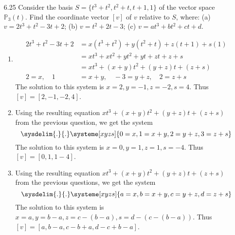 \documentclass[12pt]{article}
\theoremstyle{definition}
\theoremstyle{plain}
\begin{document}
\begin{enumerate}
\item[6.25] Consider the basis $S=\{t^3+t^2, t^2+t, t+1, 1\}$ of the vector space $\mathbb{P}_3(t)$. Find the coordinate vector $[v]$ of $v$ relative to $S$, where: (a) $v=2t^3+t^2-3t+2$; (b) $v=t^2+2t-3$; (c) $v=at^3+bt^2+ct+d$.
	\begin{enumerate}
	\item
		\begin{align*}
		2t^3+t^2-3t+2 &= x(t^3+t^2)+y(t^2+t)+z(t+1)+s(1)\\
		&= xt^3+xt^2+yt^2+yt+zt+z+s\\
		&= xt^3+(x+y)t^2+(y+z)t+(z+s)\\
		2=x, \quad 1&=x+y, \quad -3=y+z, \quad 2=z+s
		\end{align*}
		The solution to this system is $x=2, y=-1, z=-2, s=4$. Thus $[v]=[2,-1,-2,4]$.
	\item
		Using the resulting equation $xt^3+(x+y)t^2+(y+z)t+(z+s)$ from the previous question, we get the system
		\[ \sysdelim{.}{.}\systeme[xyzs]{0=x,1=x+y,2=y+z, \-3=z+s} \]
		The solution to this system is $x=0, y=1, z=1, s=-4$. Thus $[v]=[0,1,1-4]$.
\pagebreak
	\item
		Using the resulting equation $xt^3+(x+y)t^2+(y+z)t+(z+s)$ from the previous questions, we get the system
		\[ \sysdelim{.}{.}\systeme[xyzs]{a=x,b=x+y,c=y+z,d=z+s} \]
		The solution to this system is $x=a,y=b-a,z=c-(b-a),s=d-(c-(b-a))$. Thus $[v]=[a,b-a,c-b+a,d-c+b-a]$.
	\end{enumerate}
	

\end{enumerate}
\end{document}
